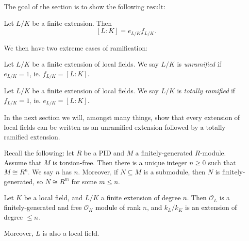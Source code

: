 \documentclass[a4paper]{article}
\begin{document}
The goal of the section is to show the following result:
\begin{thm}
  Let $L/K$ be a finite extension. Then
  \[
    [L:K] = e_{L/K}f_{L/K}.
  \]
\end{thm}

We then have two extreme cases of ramification:
\begin{defi}
  Let $L/K$ be a finite extension of local fields. We say $L/K$ is \emph{unramified} if $e_{L/K} = 1$, ie. $f_{L/K} = [L:K]$.
\end{defi}

\begin{defi}
  Let $L/K$ be a finite extension of local fields. We say $L/K$ is \emph{totally ramified} if $f_{L/K} = 1$, ie. $e_{L/K} = [L:K]$.
\end{defi}

In the next section we will, amongst many things, show that every extension of local fields can be written as an unramified extension followed by a totally ramified extension.

Recall the following: let $R$ be a PID and $M$ a finitely-generated $R$-module. Assume that $M$ is torsion-free. Then there is a unique integer $n \geq 0$ such that $M \cong R^n$. We say $n$ has  $n$. Moreover, if $N \subseteq M$ is a submodule, then $N$ is finitely-generated, so $N\cong R^m$ for some $m \leq n$.

\begin{prop}
  Let $K$ be a local field, and $L/K$ a finite extension of degree $n$. Then $\mathcal{O}_L$ is a finitely-generated and free $\mathcal{O}_K$ module of rank $n$, and $k_L/k_K$ is an extension of degree $\leq n$.

  Moreover, $L$ is also a local field.
\end{prop}
\end{document}
